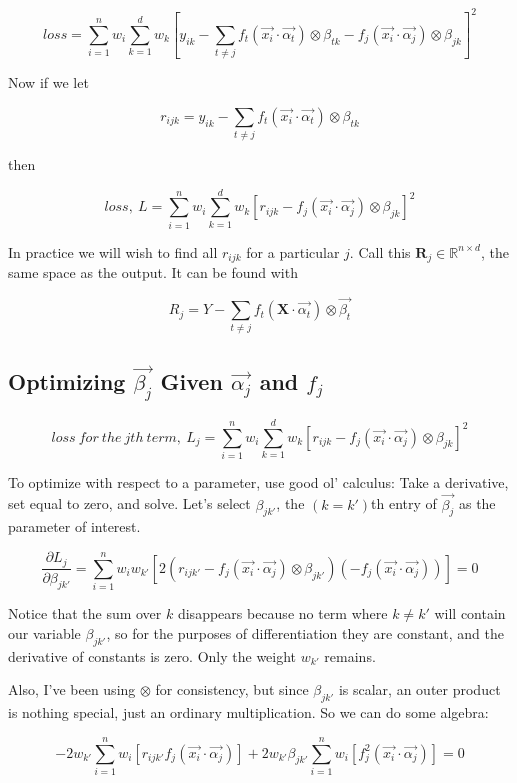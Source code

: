 \documentclass[12pt]{article}
\begin{document}
$$loss = \sum_{i=1}^n w_i \sum_{k=1}^d w_k [y_{ik} - \sum_{t \neq j} f_t(\vec{x_i} \cdot \vec{\alpha_t}) \otimes \beta_{tk} - f_j(\vec{x_i} \cdot \vec{\alpha_j}) \otimes \beta_{jk}]^2$$

Now if we let

$$r_{ijk} = y_{ik} - \sum_{t \neq j} f_t(\vec{x_i} \cdot \vec{\alpha_t}) \otimes \beta_{tk}$$

then

$$loss,\ L = \sum_{i=1}^n w_i \sum_{k=1}^d w_k [r_{ijk} - f_j(\vec{x_i} \cdot \vec{\alpha_j}) \otimes \beta_{jk}]^2$$

In practice we will wish to find all $r_{ijk}$ for a particular $j$. Call this $\pmb{R}_j \in \mathbb{R}^{n \times d}$, the same space as the output. It can be found with

$$R_{j} = Y - \sum_{t \neq j} f_t(\pmb{X} \cdot \vec{\alpha_t}) \otimes \vec{\beta_t}$$

\subsection{Optimizing $\vec{\beta_j}$ Given $\vec{\alpha_j}$ and $f_j$}

$$loss\ for\ the\ jth\ term,\ L_j = \sum_{i=1}^n w_i \sum_{k=1}^d w_k [r_{ijk} - f_j(\vec{x_i} \cdot \vec{\alpha_j}) \otimes \beta_{jk}]^2$$

To optimize with respect to a parameter, use good ol' calculus: Take a derivative, set equal to zero, and solve. Let's select $\beta_{jk'}$, the $(k=k')$th entry of $\vec{\beta_j}$ as the parameter of interest.

$$\frac{\partial L_j}{\partial \beta_{jk'}} = \sum_{i=1}^n w_i w_{k'} [2(r_{ijk'} - f_j(\vec{x_i} \cdot \vec{\alpha_j}) \otimes \beta_{jk'})(-f_j(\vec{x_i} \cdot \vec{\alpha_j}))] = 0$$

Notice that the sum over $k$ disappears because no term where $k \neq k'$ will contain our variable $\beta_{jk'}$, so for the purposes of differentiation they are constant, and the derivative of constants is zero. Only the weight $w_{k'}$ remains.

Also, I've been using $\otimes$ for consistency, but since $\beta_{jk'}$ is scalar, an outer product is nothing special, just an ordinary multiplication. So we can do some algebra:

$$ -2 w_{k'} \sum_{i=1}^n w_i [r_{ijk'} f_j(\vec{x_i} \cdot \vec{\alpha_j})] + 2 w_{k'} \beta_{jk'} \sum_{i=1}^n w_i [f_j^2(\vec{x_i} \cdot \vec{\alpha_j})] = 0 $$
\end{document}
